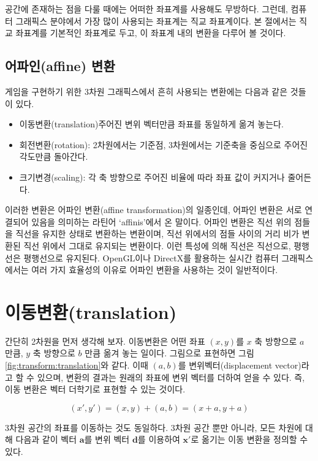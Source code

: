 공간에 존재하는 점을 다룰 때에는 어떠한 좌표계를 사용해도 무방하다. 그런데, 컴퓨터 그래픽스 분야에서 가장 많이 사용되는 좌표계는 직교 좌표계이다.
본 절에서는 직교 좌표계를 기본적인 좌표계로 두고, 이 좌표계 내의 변환을 다루어 볼 것이다.

\subsection{어파인(affine) 변환}

게임을 구현하기 위한 3차원 그래픽스에서 흔히 사용되는 변환에는 다음과 같은 것들이 있다.

\begin{itemize}
\item 이동변환(translation)주어진 변위 벡터만큼 좌표를 동일하게 옮겨 놓는다.
\item 회전변환(rotation): 2차원에서는 기준점, 3차원에서는 기준축을 중심으로 주어진 각도만큼 돌아간다.
\item 크기변경(scaling): 각 축 방향으로 주어진 비율에 따라 좌표 값이 커지거나 줄어든다.
\end{itemize}

이러한 변환은 어파인 변환(affine transformation)의 일종인데, 어파인 변환은 서로 연결되어 있음을 의미하는 라틴어 `affinis'에서 온 말이다. 
어파인 변환은 직선 위의 점들을 직선을 유지한 상태로 변환하는 변환이며, 직선 위에서의 점들 사이의 거리 비가 변환된 직선 위에서 그대로 유지되는 변환이다. 
이런 특성에 의해 직선은 직선으로, 평행선은 평행선으로 유지된다. OpenGL이나 DirectX를 활용하는 실시간 컴퓨터 그래픽스에서는 여러 가지 효율성의 이유로
어파인 변환을 사용하는 것이 일반적이다. 

\section{이동변환(translation)}
간단히 2차원을 먼저 생각해 보자. 이동변환은 어떤 좌표 $(x,y)$를 $x$ 축 방향으로 $a$ 만큼, $y$ 축 방향으로 $b$ 만큼 옮겨 놓는 일이다.
그림으로 표현하면 그림 \ref{fig:transform:translation}와 같다.
이때 $(a, b)$를 변위벡터(displacement vector)라고 할 수 있으며, 변환의 결과는 원래의 좌표에 변위 벡터를 더하여 얻을 수 있다.
즉, 이동 변환은 벡터 더학기로 표현할 수 있는 것이다.

$$(x', y') = (x,y) + (a,b) = (x+a, y+a)$$

3차원 공간의 좌표를 이동하는 것도 동일하다. 3차원 공간 뿐만 아니라, 모든 차원에 대해 다음과 같이 
벡터 $\mathbf a$를 변위 벡터 $\mathbf d$를 이용하여 $\mathbf x'$로 옮기는 이동 변환을 정의할 수 있다.

